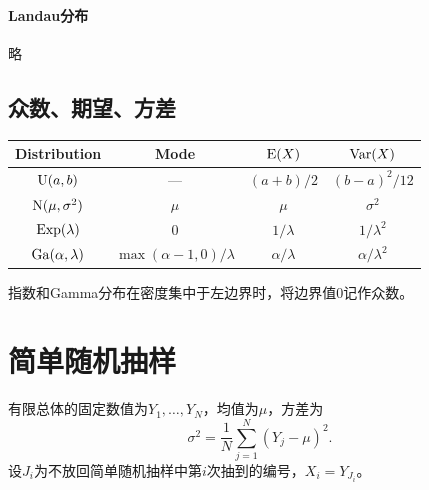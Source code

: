 \paragraph{Landau分布}

略

\subsection{众数、期望、方差}

\begin{center}
	\begin{tabular}{cccc}
		\toprule
		Distribution&Mode&$\operatorname{E}(X)$&$\operatorname{Var}(X)$\\
		\midrule
		$\operatorname{U}(a,b)$&---&$(a + b)/2$&$(b - a)^2/12$\\
		$\operatorname{N}(\mu,\sigma^2)$&$\mu$&$\mu$&$\sigma^2$\\
		$\operatorname{Exp}(\lambda)$&0&$1/\lambda$&$1/\lambda^2$\\
		$\operatorname{Ga}(\alpha,\lambda)$&$\max(\alpha - 1,0)/\lambda$&$\alpha/\lambda$&$\alpha/\lambda^2$\\
		\bottomrule
	\end{tabular}
\end{center}

指数和Gamma分布在密度集中于左边界时，将边界值0记作众数。

\section{简单随机抽样}
\label{sec:simple random sampling}

有限总体的固定数值为$Y_1,\ldots,Y_N$，均值为$\mu$，方差为
\begin{equation}\label{eq:ps-finite-population-variance}
	\sigma^2 = \frac{1}{N}\sum_{j=1}^N(Y_j - \mu)^2.
\end{equation}
设$J_i$为不放回简单随机抽样中第$i$次抽到的编号，$X_i = Y_{J_i}$。

